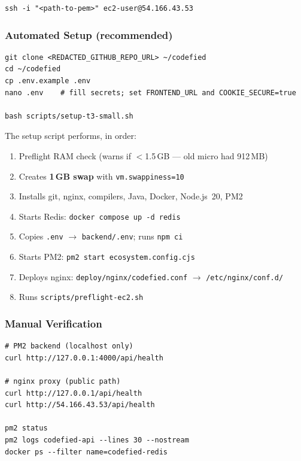 \documentclass[11pt,a4paper]{article}
\begin{document}
\begin{lstlisting}[style=terminal]
ssh -i "<path-to-pem>" ec2-user@54.166.43.53
\end{lstlisting}

\subsubsection{Automated Setup (recommended)}
\begin{lstlisting}[style=terminal]
git clone <REDACTED_GITHUB_REPO_URL> ~/codefied
cd ~/codefied
cp .env.example .env
nano .env    # fill secrets; set FRONTEND_URL and COOKIE_SECURE=true

bash scripts/setup-t3-small.sh
\end{lstlisting}

The setup script performs, in order:
\begin{enumerate}[noitemsep]
  \item Preflight RAM check (warns if $<$1.5\,GB --- old micro had 912\,MB)
  \item Creates \textbf{1\,GB swap} with \texttt{vm.swappiness=10}
  \item Installs git, nginx, compilers, Java, Docker, Node.js~20, PM2
  \item Starts Redis: \texttt{docker compose up -d redis}
  \item Copies \texttt{.env} $\rightarrow$ \texttt{backend/.env}; runs \texttt{npm ci}
  \item Starts PM2: \texttt{pm2 start ecosystem.config.cjs}
  \item Deploys nginx: \texttt{deploy/nginx/codefied.conf} $\rightarrow$ \texttt{/etc/nginx/conf.d/}
  \item Runs \texttt{scripts/preflight-ec2.sh}
\end{enumerate}

\subsubsection{Manual Verification}
\begin{lstlisting}[style=terminal]
# PM2 backend (localhost only)
curl http://127.0.0.1:4000/api/health

# nginx proxy (public path)
curl http://127.0.0.1/api/health
curl http://54.166.43.53/api/health

pm2 status
pm2 logs codefied-api --lines 30 --nostream
docker ps --filter name=codefied-redis
\end{lstlisting}
\end{document}
